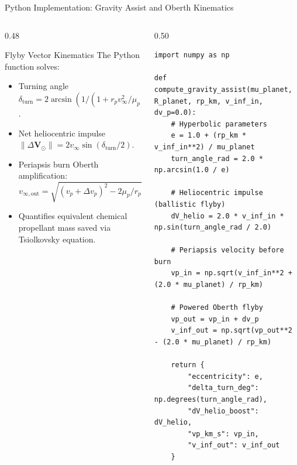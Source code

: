 \documentclass[aspectratio=169, 10pt]{beamer}
\begin{document}
\begin{frame}[fragile]{Python Implementation: Gravity Assist and Oberth Kinematics}
    \begin{columns}[t]
        \begin{column}{0.48\textwidth}
            \begin{block}{Flyby Vector Kinematics}
                \scriptsize
                The Python function solves:
                \begin{itemize}\setlength{\itemsep}{1.5pt}
                    \item Turning angle $\delta_{\text{turn}} = 2 \arcsin(1 / (1 + r_p v_\infty^2 / \mu_p))$.
                    \item Net heliocentric impulse $\|\Delta \mathbf{V}_\odot\| = 2 v_\infty \sin(\delta_{\text{turn}}/2)$.
                    \item Periapsis burn Oberth amplification:
                    \begin{equation*}
                        v_{\infty,\text{out}} = \sqrt{(v_p + \Delta v_p)^2 - 2\mu_p / r_p}
                    \end{equation*}
                    \item Quantifies equivalent chemical propellant mass saved via Tsiolkovsky equation.
                \end{itemize}
            \end{block}
        \end{column}

        \begin{column}{0.50\textwidth}
\begin{lstlisting}[style=pythoncode]
import numpy as np

def compute_gravity_assist(mu_planet, R_planet, rp_km, v_inf_in, dv_p=0.0):
    # Hyperbolic parameters
    e = 1.0 + (rp_km * v_inf_in**2) / mu_planet
    turn_angle_rad = 2.0 * np.arcsin(1.0 / e)
    
    # Heliocentric impulse (ballistic flyby)
    dV_helio = 2.0 * v_inf_in * np.sin(turn_angle_rad / 2.0)
    
    # Periapsis velocity before burn
    vp_in = np.sqrt(v_inf_in**2 + (2.0 * mu_planet) / rp_km)
    
    # Powered Oberth flyby
    vp_out = vp_in + dv_p
    v_inf_out = np.sqrt(vp_out**2 - (2.0 * mu_planet) / rp_km)
    
    return {
        "eccentricity": e,
        "delta_turn_deg": np.degrees(turn_angle_rad),
        "dV_helio_boost": dV_helio,
        "vp_km_s": vp_in,
        "v_inf_out": v_inf_out
    }
\end{lstlisting}
        \end{column}
    \end{columns}
\end{frame}
\end{document}
